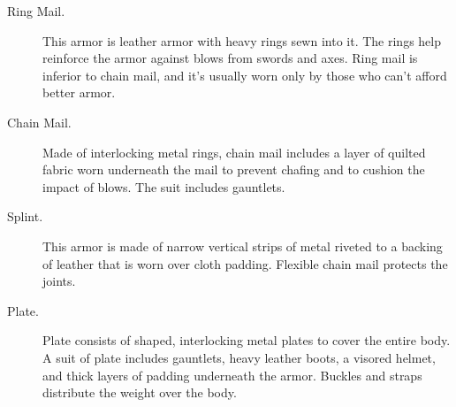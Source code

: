 \begin{description}
\item[Ring Mail.]
This armor is leather armor with heavy rings sewn into it. The rings
help reinforce the armor against blows from swords and axes. Ring mail
is inferior to chain mail, and it's usually worn only by those who can't
afford better armor.
\item[Chain Mail.]
Made of interlocking metal rings, chain mail includes a layer of quilted
fabric worn underneath the mail to prevent chafing and to cushion the
impact of blows. The suit includes gauntlets.
\item[Splint.]
This armor is made of narrow vertical strips of metal riveted to a
backing of leather that is worn over cloth padding. Flexible chain mail
protects the joints.
\item[Plate.]
Plate consists of shaped, interlocking metal plates to cover the entire
body. A suit of plate includes gauntlets, heavy leather boots, a visored
helmet, and thick layers of padding underneath the armor. Buckles and
straps distribute the weight over the body.
\end{description}

